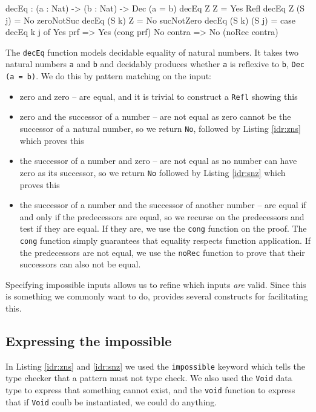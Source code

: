         \begin{code}[label={des:dec-eq}, caption={Proving equality of natural numbers}]
        decEq : (a : Nat) -> (b : Nat) -> Dec (a = b)
        decEq Z Z = Yes Refl
        decEq Z (S j) = No zeroNotSuc
        decEq (S k) Z = No sucNotZero
        decEq (S k) (S j) = case decEq k j of
                                Yes prf   => Yes (cong prf)
                                No contra => No (noRec contra)
        \end{code}
        The \texttt{decEq} function models decidable equality of natural numbers. It takes two natural numbers \texttt{a} and \texttt{b} and decidably produces whether \texttt{a} is reflexive to \texttt{b},\linebreak
        \texttt{Dec (a = b)}. We do this by pattern matching on the input:
        \begin{itemize}
            \item zero and zero -- are equal, and it is trivial to construct a
            \texttt{Refl} showing this
            \item zero and the successor of a number -- are not equal as zero cannot
            be the successor of a natural number, so we return \texttt{No},
            followed by Listing \ref{idr:zns} which proves this
            \item the successor of a number and zero -- are not equal as no number 
            can have zero as its successor, so we return \texttt{No} followed
            by Listing \ref{idr:snz} which proves this
            \item the successor of a number and the successor of another number --
            are equal if and only if the predecessors are equal, so we recurse
            on the predecessors and test if they are equal. If they are, we
            use the \texttt{cong} function on the proof. The \texttt{cong}
            function simply guarantees that equality respects function
            application. If the predecessors are not equal, we use the
            \texttt{noRec} function to prove that their successors can also
            not be equal.
        \end{itemize}
        
        Specifying impossible inputs allows us to refine which inputs \textit{are} valid. Since this is something we commonly want to do, \Idris provides several constructs for facilitating this.
    
    \subsection{Expressing the impossible}
        In Listing \ref{idr:zns} and \ref{idr:snz} we used the \texttt{impossible} keyword which tells the type checker that a pattern must not type check. We also used the \texttt{Void} data type to express that something cannot exist, and the \texttt{void} function to express that if \texttt{Void} coulb be instantiated, we could do anything.
        
